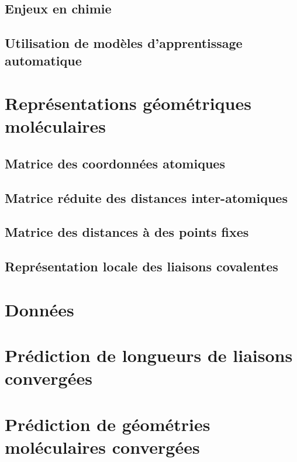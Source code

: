\documentclass{report}
\begin{document}
	\section{Enjeux en chimie}
		
	\section{Utilisation de modèles d'apprentissage automatique}
		
		
\chapter{Représentations géométriques moléculaires}
	\section{Matrice des coordonnées atomiques}
		

	\section{Matrice réduite des distances inter-atomiques}
		
		
	\section{Matrice des distances à des points fixes}
		
		
	\section{Représentation locale des liaisons covalentes}
		

\chapter{Données}

\chapter{Prédiction de longueurs de liaisons convergées}

\chapter{Prédiction de géométries moléculaires convergées}
\end{document}
